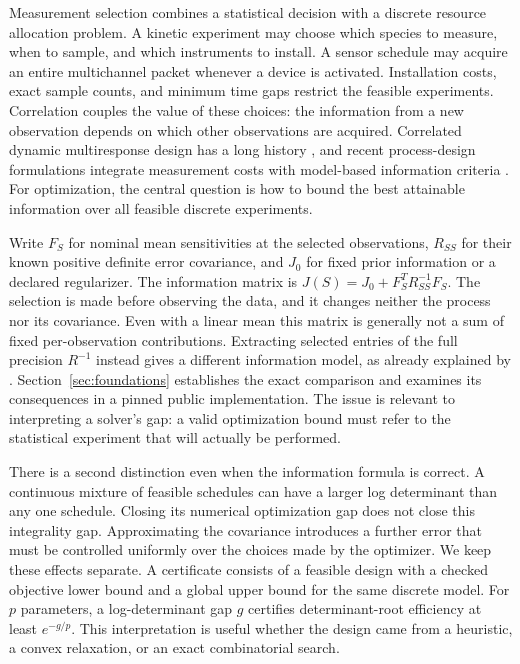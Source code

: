 Measurement selection combines a statistical decision with a discrete resource
allocation problem. A kinetic experiment may choose which species to measure,
when to sample, and which instruments to install. A sensor schedule may acquire
an entire multichannel packet whenever a device is activated. Installation
costs, exact sample counts, and minimum time gaps restrict the feasible
experiments. Correlation couples the value of these choices: the information
from a new observation depends on which other observations are acquired.
Correlated dynamic multiresponse design has a long history
\citep{Patan2007}, and recent process-design formulations integrate measurement
costs with model-based information criteria \citep{Wang2024}.
For optimization, the central question is how to bound the best attainable
information over all feasible discrete experiments.

Write $F_S$ for nominal mean sensitivities at the selected observations,
$R_{SS}$ for their known positive definite error covariance, and $J_0$ for
fixed prior information or a declared regularizer. The information matrix is
$J(S)=J_0+F_S^TR_{SS}^{-1}F_S$. The selection is made before observing the
data, and it changes neither the process nor its covariance. Even with a
linear mean this matrix is generally not a sum of fixed per-observation
contributions. Extracting selected entries of the full precision $R^{-1}$
instead gives a different information model, as already explained by
\citet{Liu2016}. Section~\ref{sec:foundations} establishes the exact comparison
and examines its consequences in a pinned public implementation. The issue
is relevant to interpreting a solver's gap: a valid optimization bound must
refer to the statistical experiment that will actually be performed.

There is a second distinction even when the information formula is correct.
A continuous mixture of feasible schedules can have a larger log determinant
than any one schedule. Closing its numerical optimization gap does not close
this integrality gap. Approximating the covariance introduces a further error
that must be controlled uniformly over the choices made by the optimizer.
We keep these effects separate. A certificate consists of a feasible design
with a checked objective lower bound and a global upper bound for the same
discrete model. For $p$ parameters, a log-determinant gap $g$ certifies
determinant-root efficiency at least $e^{-g/p}$. This interpretation is useful
whether the design came from a heuristic, a convex relaxation, or an exact
combinatorial search.

